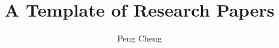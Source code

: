 \documentclass[sigconf, nonacm]{acmart}
\title{A Template of Research Papers}
\author{Peng Cheng}
\affiliation{%
	\institution{East China Normal University}
	\state{Shanghai}
	\country{China}
}
\begin{document}


\maketitle























\bgroup\small

\let\xxx=\bibitem\def\bibitem{\par\vspace{1mm}\xxx} %

\egroup
\end{document}
